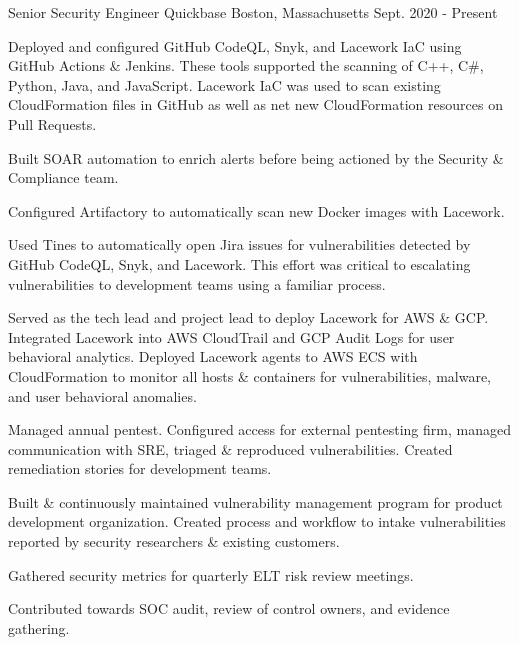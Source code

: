 

\begin{cventries}
\vspace{-3mm}
  \cventry
    {Senior Security Engineer} %
    {Quickbase} %
    {Boston, Massachusetts} %
    {Sept. 2020 - Present} %
    {
      \begin{cvitems} %
        \item {
          Deployed and configured GitHub CodeQL, Snyk, and Lacework IaC using GitHub Actions \& Jenkins. These tools supported the scanning of C++, C\#, Python, Java, and JavaScript. Lacework IaC was used to scan existing CloudFormation files in GitHub as well as net new CloudFormation resources on Pull Requests.
        }
        \item {
          Built SOAR automation to enrich alerts before being actioned by the Security \& Compliance team.
        }
        \item {
          Configured Artifactory to automatically scan new Docker images with Lacework.
        }
        \item {
          Used Tines to automatically open Jira issues for vulnerabilities detected by GitHub CodeQL, Snyk, and Lacework. This effort was critical to escalating vulnerabilities to development teams using a familiar process.
        }
        \item {
          Served as the tech lead and project lead to deploy Lacework for AWS \& GCP. Integrated Lacework into AWS CloudTrail and GCP Audit Logs for user behavioral analytics. Deployed Lacework agents to AWS ECS with CloudFormation to monitor all hosts \& containers for vulnerabilities, malware, and user behavioral anomalies.
        }
        \item {
          Managed annual pentest. Configured access for external pentesting firm, managed communication with SRE, triaged \& reproduced vulnerabilities. Created remediation stories for development teams.
        }
        \item {
          Built \& continuously maintained vulnerability management program for product development organization. Created process and workflow to intake vulnerabilities reported by security researchers \& existing customers.
        }
        \item {
          Gathered security metrics for quarterly ELT risk review meetings.
        }
        \item {
          Contributed towards SOC audit, review of control owners, and evidence gathering.
        }
      \end{cvitems}
    }


\end{cventries}
